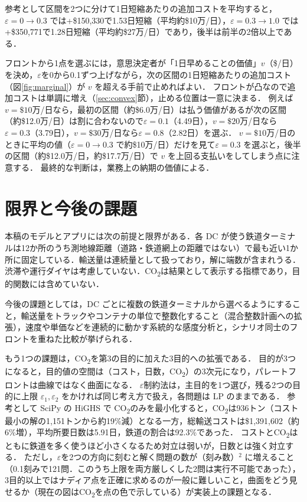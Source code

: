 \documentclass[a4paper,11pt]{ltjsarticle}
\newcommand{\COO}{CO\textsubscript{2}}
\begin{document}
参考として区間を2つに分けて1日短縮あたりの追加コストを平均すると，$\varepsilon=0\to0.3$ では+\$150,330で1.53日短縮（平均約\$10万/日），$\varepsilon=0.3\to1.0$ では+\$350,771で1.28日短縮（平均約\$27万/日）であり，後半は前半の2倍以上である．

フロントから1点を選ぶには，意思決定者が「1日早めることの価値」$v$（\$/日）を決め，$\varepsilon$を0から0.1ずつ上げながら，次の区間の1日短縮あたりの追加コスト（図\ref{fig:marginal}）が $v$ を超える手前で止めればよい．
フロントが凸なので追加コストは単調に増え（\ref{sec:convex}節），止める位置は一意に決まる．
例えば $v=\$10$万/日なら，最初の区間（約\$6.0万/日）は払う価値があるが次の区間（約\$12.0万/日）は割に合わないので$\varepsilon=0.1$（4.49日），$v=\$20$万/日なら$\varepsilon=0.3$（3.79日），$v=\$30$万/日なら$\varepsilon=0.8$（2.82日）を選ぶ．
$v=\$10$万/日のときに平均の値（$\varepsilon=0\to0.3$ で約\$10万/日）だけを見て$\varepsilon=0.3$ を選ぶと，後半の区間（約\$12.0万/日，約\$17.7万/日）で $v$ を上回る支払いをしてしまう点に注意する．
最終的な判断は，業務上の納期の価値による．


\section{限界と今後の課題}
本稿のモデルとアプリには次の前提と限界がある．各 DC が使う鉄道ターミナルは12か所のうち測地線距離（道路・鉄道網上の距離ではない）で最も近い1か所に固定している．輸送量は連続量として扱っており，解に端数が含まれうる．渋滞や運行ダイヤは考慮していない．\COO{}は結果として表示する指標であり，目的関数には含めていない．

今後の課題としては，DC ごとに複数の鉄道ターミナルから選べるようにすること，輸送量をトラックやコンテナの単位で整数化すること（混合整数計画への拡張），速度や単価などを連続的に動かす系統的な感度分析と，シナリオ同士のフロントを重ねた比較が挙げられる．

もう1つの課題は，\COO{}を第3の目的に加えた3目的への拡張である．
目的が3つになると，目的値の空間は（コスト，日数，\COO{}）の3次元になり，パレートフロントは曲線ではなく曲面になる．
$\varepsilon$制約法は，主目的を1つ選び，残る2つの目的に上限 $\varepsilon_1,\varepsilon_2$ をかければ同じ考え方で扱え，各問題は LP のままである．
参考として SciPy の HiGHS で \COO{}のみを最小化すると，\COO{}は936トン（コスト最小の解の1,151トンから約19\%減）となる一方，総輸送コストは\$1,391,602（約6\%増），平均所要日数は5.91日，鉄道の割合は92.3\%であった．
コストと\COO{}はともに鉄道を多く使うほど小さくなるため対立は弱いが，日数とは強く対立する．
ただし，$\varepsilon$を2つの方向に刻むと解く問題の数が（刻み数）$^2$ に増えること（0.1刻みで121問．このうち上限を両方厳しくした2問は実行不可能であった），3目的以上ではナディア点を正確に求めるのが一般に難しいこと，曲面をどう見せるか（現在の図は\COO{}を点の色で示している）が実装上の課題となる．
\end{document}
